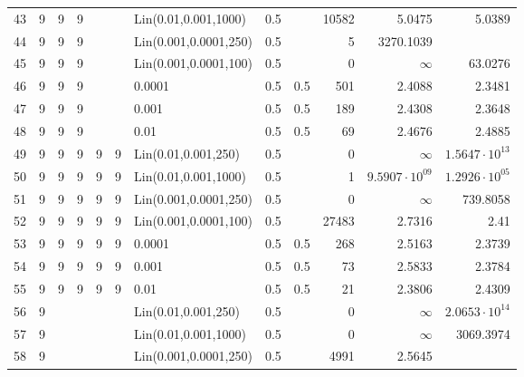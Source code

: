 \begin{longtable}{lrrrrrlrrrrr}
  43 &       9 & 9 & 9 &   &   &  Lin(0.01,0.001,1000) &  0.5 &        &   10582 &                 5.0475 &                5.0389 \\
  44 &       9 & 9 & 9 &   &   & Lin(0.001,0.0001,250) &  0.5 &        &       5 &              3270.1039 &                       \\
  45 &       9 & 9 & 9 &   &   & Lin(0.001,0.0001,100) &  0.5 &        &       0 &               $\infty$ &               63.0276 \\
  46 &       9 & 9 & 9 &   &   &                0.0001 &  0.5 &    0.5 &     501 &                 2.4088 &                2.3481 \\
  47 &       9 & 9 & 9 &   &   &                 0.001 &  0.5 &    0.5 &     189 &                 2.4308 &                2.3648 \\
  48 &       9 & 9 & 9 &   &   &                  0.01 &  0.5 &    0.5 &      69 &                 2.4676 &                2.4885 \\
  49 &       9 & 9 & 9 & 9 & 9 &   Lin(0.01,0.001,250) &  0.5 &        &       0 &               $\infty$ & $1.5647\cdot 10^{13}$ \\
  50 &       9 & 9 & 9 & 9 & 9 &  Lin(0.01,0.001,1000) &  0.5 &        &       1 &  $9.5907\cdot 10^{09}$ & $1.2926\cdot 10^{05}$ \\
  51 &       9 & 9 & 9 & 9 & 9 & Lin(0.001,0.0001,250) &  0.5 &        &       0 &               $\infty$ &              739.8058 \\
  52 &       9 & 9 & 9 & 9 & 9 & Lin(0.001,0.0001,100) &  0.5 &        &   27483 &                 2.7316 &                  2.41 \\
  53 &       9 & 9 & 9 & 9 & 9 &                0.0001 &  0.5 &    0.5 &     268 &                 2.5163 &                2.3739 \\
  54 &       9 & 9 & 9 & 9 & 9 &                 0.001 &  0.5 &    0.5 &      73 &                 2.5833 &                2.3784 \\
  55 &       9 & 9 & 9 & 9 & 9 &                  0.01 &  0.5 &    0.5 &      21 &                 2.3806 &                2.4309 \\
  56 &       9 &   &   &   &   &   Lin(0.01,0.001,250) &  0.5 &        &       0 &               $\infty$ & $2.0653\cdot 10^{14}$ \\
  57 &       9 &   &   &   &   &  Lin(0.01,0.001,1000) &  0.5 &        &       0 &               $\infty$ &             3069.3974 \\
  58 &       9 &   &   &   &   & Lin(0.001,0.0001,250) &  0.5 &        &    4991 &                 2.5645 &                       \\

\end{longtable}
